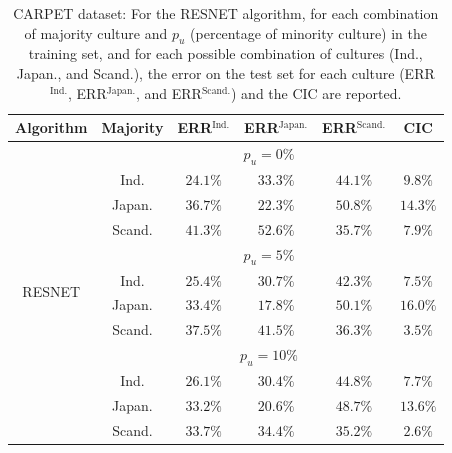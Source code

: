 \begin{table}
\footnotesize
\centering
\setlength{\tabcolsep}{0.1cm}
\renewcommand{\arraystretch}{1.55}
\begin{tabular}{c|c|c|c|c|c|}
\toprule
\textbf{Algorithm} & \textbf{Majority} & \textbf{ERR$^{\text{Ind.}}$}
& \textbf{ERR$^{\text{Japan.}}$}
& \textbf{ERR$^{\text{Scand.}}$} 
& \textbf{CIC} \\
\midrule
\multicolumn{1}{c}{\multirow{12}{*}{RESNET}} & \multicolumn{5}{c}{$p_u = 0\%$}\\
\hhline{~-----}
& Ind. & $24.1\% $ & $33.3\% $ & $44.1\% $ & $9.8\% $ \\
& Japan. & $36.7\% $ & $22.3\% $ & $50.8\% $ & $14.3\% $ \\
& Scand. & $41.3\% $ & $52.6\% $ & $35.7\% $ & $7.9\% $ \\
\hhline{~-----}
\multicolumn{1}{c}{} & \multicolumn{5}{c}{$p_u = 5\%$}\\
\hhline{~-----}
& Ind. & $25.4\% $ & $30.7\% $ & $42.3\% $ & $7.5\% $ \\
& Japan. & $33.4\% $ & $17.8\% $ & $50.1\% $ & $16.0\% $ \\
& Scand. & $37.5\% $ & $41.5\% $ & $36.3\% $ & $3.5\% $ \\
\hhline{~-----}
\multicolumn{1}{c}{} & \multicolumn{5}{c}{$p_u = 10\%$}\\
\hhline{~-----}
& Ind. & $26.1\% $ & $30.4\% $ & $44.8\% $ & $7.7\% $ \\
& Japan. & $33.2\% $ & $20.6\% $ & $48.7\% $ & $13.6\% $ \\
& Scand. & $33.7\% $ & $34.4\% $ & $35.2\% $ & $2.6\% $ \\
\midrule
\end{tabular}
\caption{CARPET dataset: For the RESNET algorithm, for each combination of majority culture and $p_u$ (percentage of minority culture) in the training set, and for each possible combination of cultures (Ind., Japan., and Scand.), the error on the test set for each culture (ERR$^\text{Ind.}$, ERR$^\text{Japan.}$, and ERR$^\text{Scand.}$) and the CIC are reported.}
\label{ch3:tab:ris:ml:carpet}
\end{table}
%
%

